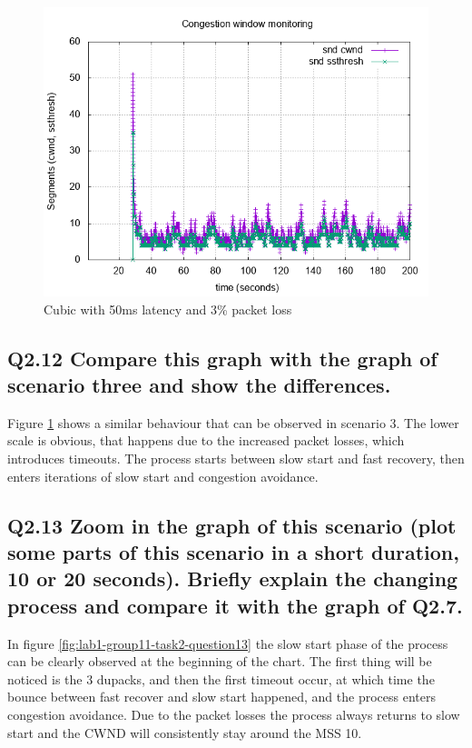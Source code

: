 \documentclass{article}
\begin{document}
\begin{figure}[h]
    \centering
    \includegraphics[scale=0.5]{images/lab1-group11-task2-question11.png}
    \caption{Cubic with 50ms latency and 3\% packet loss }
    \label{fig:lab1-group11-task2-question11}
\end{figure}


\subsection{Q2.12 Compare this graph with the graph of scenario three
and show the differences.}

Figure \ref{fig:lab1-group11-task2-question11} shows a similar behaviour that can be observed in scenario 3. The lower scale is obvious, that happens due to the increased packet losses, which introduces timeouts. The process starts between slow start and fast recovery, then enters iterations of slow start and congestion avoidance.
\newpage
\subsection{Q2.13 Zoom in the graph of this scenario (plot some parts of
this scenario in a short duration, 10 or 20 seconds). Briefly explain
the changing process and compare it with the graph of Q2.7.}

In figure \ref{fig:lab1-group11-task2-question13} the slow start phase of the process can be clearly observed at the beginning of the chart. The first thing will be noticed is the 3 dupacks, and then the first timeout occur, at which time the bounce between fast recover and slow start happened, and the process enters congestion avoidance. Due to the packet losses the process always returns to slow start and the CWND will consistently stay around the MSS 10.
\end{document}
